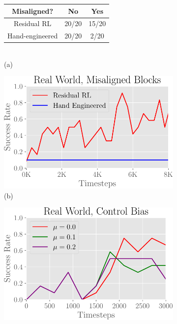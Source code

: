 \begin{figure}[t]
    \vspace{6pt}
    \centering
    \begin{subfigure}[b]{0.38\linewidth}
        \begin{tabular}{ | c || c | c |}
            \hline
            Misaligned? & No & Yes  \\ \hline
            Residual RL & 20/20 & 15/20  \\ \hline
            Hand-engineered  & 20/20 & 2/20  \\ \hline
        \end{tabular}
        \vspace{1.2cm} \\
        \centering
        (a)
    \end{subfigure}
    \begin{subfigure}[b]{0.3\linewidth}
        \includegraphics[width=0.99\linewidth]{residualrl/figs/real_world_envvar_success.pdf} \\
        \centering
        (b)
    \end{subfigure}
    \begin{subfigure}[b]{0.3\linewidth}
        \includegraphics[width=0.99\linewidth]{residualrl/figs/real_world_control_bias.pdf} \\

\end{subfigure}
\end{figure}
